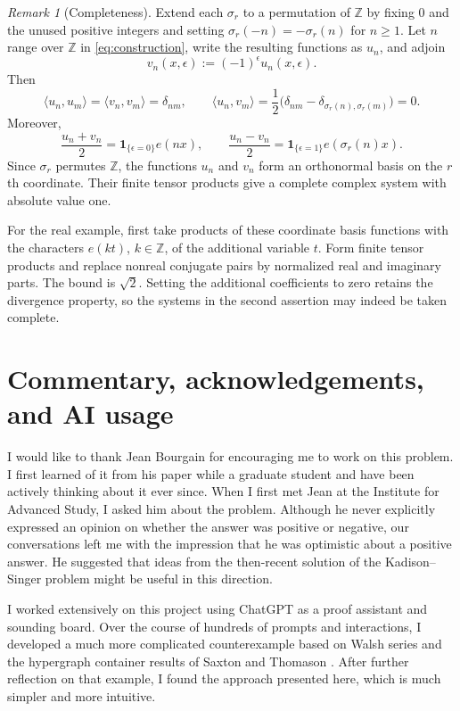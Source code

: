 \documentclass[11pt]{article}
\theoremstyle{remark}
\newtheorem{remark}[theorem]{Remark}
\numberwithin{equation}{section}
\newcommand{\Z}{\mathbb Z}
\newcommand{\one}{\mathbf 1}
\begin{document}
\begin{remark}[Completeness]
Extend each $\sigma_r$ to a permutation of $\Z$ by fixing $0$ and the unused positive integers and setting $\sigma_r(-n)=-\sigma_r(n)$ for $n\geq1$. Let $n$ range over $\Z$ in \eqref{eq:construction}, write the resulting functions as $u_n$, and adjoin
\[
 v_n(x,\epsilon):=(-1)^\epsilon u_n(x,\epsilon).
\]
Then
\[
 \langle u_n,u_m\rangle=\langle v_n,v_m\rangle=\delta_{nm},
 \qquad
 \langle u_n,v_m\rangle
 =\frac12\bigl(\delta_{nm}-\delta_{\sigma_r(n),\sigma_r(m)}\bigr)=0.
\]
Moreover,
\[
 \frac{u_n+v_n}{2}=\one_{\{\epsilon=0\}}e(nx),
 \qquad
 \frac{u_n-v_n}{2}=\one_{\{\epsilon=1\}}e(\sigma_r(n)x).
\]
Since $\sigma_r$ permutes $\Z$, the functions $u_n$ and $v_n$ form an orthonormal basis on the $r$th coordinate. Their finite tensor products give a complete complex system with absolute value one.

For the real example, first take products of these coordinate basis functions with the characters $e(kt)$, $k\in\Z$, of the additional variable $t$. Form finite tensor products and replace nonreal conjugate pairs by normalized real and imaginary parts. The bound is $\sqrt2$. Setting the additional coefficients to zero retains the divergence property, so the systems in the second assertion may indeed be taken complete.
\end{remark}

\section*{Commentary, acknowledgements, and AI usage}

I would like to thank Jean Bourgain for encouraging me to work on this problem. I first learned of it from his paper \cite{Bourgain} while a graduate student and have been actively thinking about it ever since. When I first met Jean at the Institute for Advanced Study, I asked him about the problem. Although he never explicitly expressed an opinion on whether the answer was positive or negative, our conversations left me with the impression that he was optimistic about a positive answer. He suggested that ideas from the then-recent solution of the Kadison--Singer problem \cite{MSS} might be useful in this direction.

I worked extensively on this project using ChatGPT as a proof assistant and sounding board. Over the course of hundreds of prompts and interactions, I developed a much more complicated counterexample based on Walsh series and the hypergraph container results of Saxton and Thomason \cite{SaxtonThomason}. After further reflection on that example, I found the approach presented here, which is much simpler and more intuitive.
\end{document}

